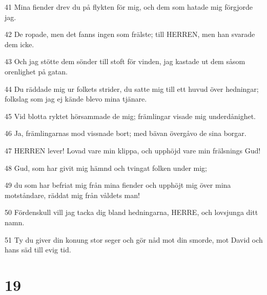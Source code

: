 \par 41 Mina fiender drev du på flykten för mig, och dem som hatade mig förgjorde jag.
\par 42 De ropade, men det fanns ingen som frälste; till HERREN, men han svarade dem icke.
\par 43 Och jag stötte dem sönder till stoft för vinden, jag kastade ut dem såsom orenlighet på gatan.
\par 44 Du räddade mig ur folkets strider, du satte mig till ett huvud över hedningar; folkslag som jag ej kände blevo mina tjänare.
\par 45 Vid blotta ryktet hörsammade de mig; främlingar visade mig underdånighet.
\par 46 Ja, främlingarnas mod vissnade bort; med bävan övergåvo de sina borgar.
\par 47 HERREN lever! Lovad vare min klippa, och upphöjd vare min frälsnings Gud!
\par 48 Gud, som har givit mig hämnd och tvingat folken under mig;
\par 49 du som har befriat mig från mina fiender och upphöjt mig över mina motståndare, räddat mig från våldets man!
\par 50 Fördenskull vill jag tacka dig bland hedningarna, HERRE, och lovsjunga ditt namn.
\par 51 Ty du giver din konung stor seger och gör nåd mot din smorde, mot David och hans säd till evig tid.

\chapter{19}

